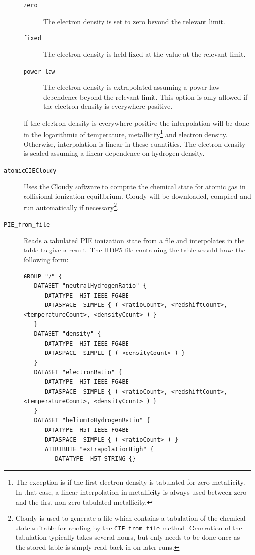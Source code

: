 \begin{description}
 \begin{description}
  \item[{\tt zero}] The electron density is set to zero beyond the relevant limit.
  \item[{\tt fixed}] The electron density is held fixed at the value at the relevant limit.
  \item[{\tt power law}] The electron density is extrapolated assuming a power-law dependence beyond the relevant limit. This option is only allowed if the electron density is everywhere positive.
 \end{description}
 If the electron density is everywhere positive the interpolation will be done in the logarithmic of temperature, metallicity\footnote{The exception is if the first electron density is tabulated for zero metallicity. In that case, a linear interpolation in metallicity is always used between zero and the first non-zero tabulated metallicity.} and electron density. Otherwise, interpolation is linear in these quantities. The electron density is scaled assuming a linear dependence on hydrogen density.
 \item [{\tt atomicCIECloudy}] Uses the {\sc Cloudy} software to compute the chemical state for atomic gas in collisional ionization equilibrium. {\sc Cloudy} will be downloaded, compiled and run automatically if necessary\footnote{{\sc Cloudy} is used to generate a file which contains a tabulation of the chemical state suitable for reading by the {\tt CIE from file} method. Generation of the tabulation typically takes several hours, but only needs to be done once as the stored table is simply read back in on later runs.}.
 \item [{\tt PIE\_from\_file}]  Reads a tabulated PIE ionization state from a file and interpolates in the table to give a result. The HDF5 file containing the table should have the following form:
\begin{verbatim}
GROUP "/" {
   DATASET "neutralHydrogenRatio" {
      DATATYPE  H5T_IEEE_F64BE
      DATASPACE  SIMPLE { ( <ratioCount>, <redshiftCount>, <temperatureCount>, <densityCount> ) }
   }
   DATASET "density" {
      DATATYPE  H5T_IEEE_F64BE
      DATASPACE  SIMPLE { ( <densityCount> ) }
   }
   DATASET "electronRatio" {
      DATATYPE  H5T_IEEE_F64BE
      DATASPACE  SIMPLE { ( <ratioCount>, <redshiftCount>, <temperatureCount>, <densityCount> ) }
   }
   DATASET "heliumToHydrogenRatio" {
      DATATYPE  H5T_IEEE_F64BE
      DATASPACE  SIMPLE { ( <ratioCount> ) }
      ATTRIBUTE "extrapolationHigh" {
         DATATYPE  H5T_STRING {}

\end{verbatim}
\end{description}
